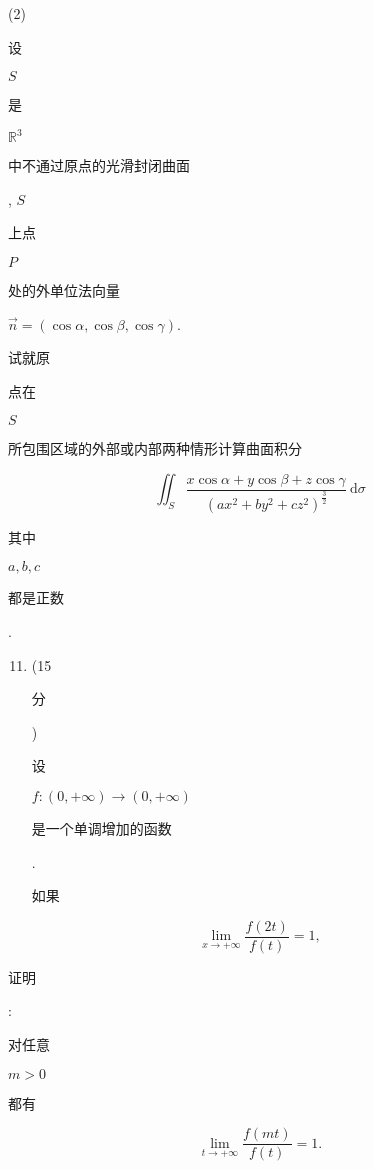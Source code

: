 \documentclass[10pt]{article}
\begin{document}
(2) \begin{CJK}{UTF8}{mj}设\end{CJK} $S$ \begin{CJK}{UTF8}{mj}是\end{CJK} $\mathbb{R}^{3}$ \begin{CJK}{UTF8}{mj}中不通过原点的光滑封闭曲面\end{CJK}, $S$ \begin{CJK}{UTF8}{mj}上点\end{CJK} $P$ \begin{CJK}{UTF8}{mj}处的外单位法向量\end{CJK} $\vec{n}=(\cos \alpha, \cos \beta, \cos \gamma)$. \begin{CJK}{UTF8}{mj}试就原\end{CJK} \begin{CJK}{UTF8}{mj}点在\end{CJK} $S$ \begin{CJK}{UTF8}{mj}所包围区域的外部或内部两种情形计算曲面积分\end{CJK}
$$
\iint_{S} \frac{x \cos \alpha+y \cos \beta+z \cos \gamma}{\left(a x^{2}+b y^{2}+c z^{2}\right)^{\frac{3}{2}}} \mathrm{~d} \sigma
$$
\begin{CJK}{UTF8}{mj}其中\end{CJK} $a, b, c$ \begin{CJK}{UTF8}{mj}都是正数\end{CJK}.

\begin{enumerate}
  \setcounter{enumi}{10}
  \item (15 \begin{CJK}{UTF8}{mj}分\end{CJK}) \begin{CJK}{UTF8}{mj}设\end{CJK} $f:(0,+\infty) \rightarrow(0,+\infty)$ \begin{CJK}{UTF8}{mj}是一个单调增加的函数\end{CJK}. \begin{CJK}{UTF8}{mj}如果\end{CJK}
\end{enumerate}
$$
\lim _{x \rightarrow+\infty} \frac{f(2 t)}{f(t)}=1,
$$
\begin{CJK}{UTF8}{mj}证明\end{CJK}: \begin{CJK}{UTF8}{mj}对任意\end{CJK} $m>0$ \begin{CJK}{UTF8}{mj}都有\end{CJK}
$$
\lim _{t \rightarrow+\infty} \frac{f(m t)}{f(t)}=1 .
$$
\end{document}
